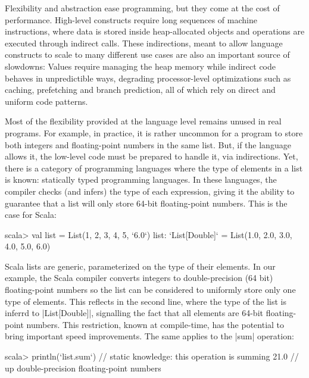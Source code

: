 Flexibility and abstraction ease programming, but they come at the cost of performance. High-level constructs require long sequences of machine instructions, where data is stored inside heap-allocated objects and operations are executed through indirect calls. These indirections, meant to allow language constructs to scale to many different use cases are also an important source of slowdowns: Values require managing the heap memory while indirect code behaves in unpredictible ways, degrading processor-level optimizations such as caching, prefetching and branch prediction, all of which rely on direct and uniform code patterns. %

Most of the flexibility provided at the language level remains unused in real programs. For example, in practice, it is rather uncommon for a program to store both integers and floating-point numbers in the same list. But, if the language allows it, the low-level code must be prepared to handle it, via indirections. Yet, there is a category of programming languages where the type of elements in a list is known: statically typed programming languages. In these languages, the compiler checks (and infers) the type of each expression, giving it the ability to guarantee that a list will only store 64-bit floating-point numbers. This is the case for Scala:

\begin{lstlisting-nobreak}
 scala> val list = List(1, 2, 3, 4, 5, `6.0`)
 list: `List[Double]` = List(1.0, 2.0, 3.0, 4.0, 5.0, 6.0)
\end{lstlisting-nobreak}

Scala lists are generic, parameterized on the type of their elements. In our example, the Scala compiler converts integers to double-precision (64 bit) floating-point numbers so the list can be considered to uniformly store only one type of elements. This reflects in the second line, where the type of the list is inferrd to |List[Double]|, signalling the fact that all elements are 64-bit floating-point numbers. This restriction, known at compile-time, has the potential to bring important speed improvements. The same applies to the |sum| operation:

\begin{lstlisting-nobreak}
 scala> println(`list.sum`) // static knowledge: this operation is summing
 21.0                             // up double-precision floating-point numbers
\end{lstlisting-nobreak}

